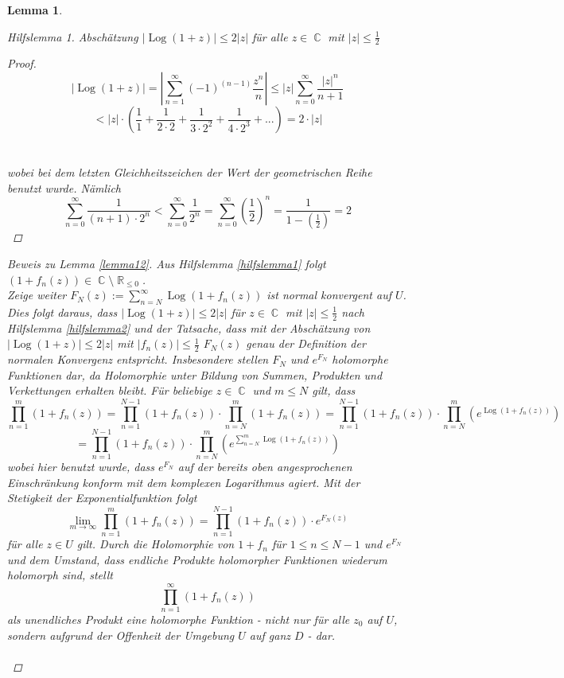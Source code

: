 \documentclass[10pt,a4paper]{article}
\theoremstyle{plain}
\newtheorem{lem}[thm]{Lemma}
\theoremstyle{definition}
\theoremstyle{remark}
\newtheorem{hilfslem}{Hilfslemma}
\DeclareMathOperator{\R}{\mathbb{R}}
\DeclareMathOperator{\C}{\mathbb{C}}
\DeclareMathOperator{\Log}{Log}
\begin{document}
\begin{lem}
\begin{hilfslem}
Abschätzung $ |\Log(1+z)|\leq 2|z|$ für alle $z \in \C $ mit $ |z| \leq \frac{1}{2}$

\begin{proof}

$$|\Log(1+z)|= |\sum_{n = 1}^\infty (-1)^{(n-1)}\frac{z^{n}}{n}|\leq|z|\sum_{n = 0}^\infty\frac{|z|^{n}}{n + 1}$$
$$< |z|\cdot (\frac{1}{1}+\frac{1}{2\cdot 2}+\frac{1}{3 \cdot2^2}+\frac{1}{4 \cdot2^3}+...) = 2\cdot|z| $$
\\
\\
wobei bei dem letzten Gleichheitszeichen der Wert der geometrischen Reihe benutzt wurde. Nämlich $$\sum_{n=0}^{\infty}\frac{1}{(n+1)\cdot2^{n}} < \sum_{n=0}^{\infty}\frac{1}{2^{n}} = \sum_{n=0}^{\infty}(\frac{1}{2})^n = \frac{1}{1-(\frac{1}{2})} = 2 $$

\end{proof}
\end{hilfslem}

\begin{proof}[Beweis zu Lemma \ref{lemma12}]
\noindent Aus Hilfslemma \ref{hilfslemma1} folgt $(1 + f_{n}(z)) \in \C \setminus \R_{\leq 0 }$. \\
 Zeige weiter $F_{N}(z) := \sum_{n = N}^\infty \Log( 1 + f_{n}(z))$ ist normal konvergent auf $U$. Dies folgt daraus, dass $| \Log( 1 + z) | \leq 2|z| $ für $z \in \C$ mit $|z| \leq \frac{1}{2}$ nach Hilfslemma \ref{hilfslemma2}  und der Tatsache, dass mit der Abschätzung von $|\Log(1+z)| \leq 2|z|$ mit $|f_n(z)|\leq \frac{1}{2}$ $F_{N}(z)$ genau der Definition der normalen Konvergenz entspricht.
Insbesondere stellen $F_{N}$ und $e^{F_{N}}$ holomorphe Funktionen dar, da Holomorphie unter Bildung von Summen, Produkten und Verkettungen erhalten bleibt. Für beliebige $z \in \C $ und $m\leq N$ gilt, dass 
$$\prod_{n = 1 }^{m}( 1 + f_{n}(z)) = \prod_{n = 1}^{N - 1}( 1 + f_{n}(z)) \cdot \prod_{n = N}^{m}( 1 + f_{n}(z))= \prod_{n = 1}^{N - 1}( 1 + f_{n}(z)) \cdot \prod_{n = N}^{m}(e^{\Log( 1 + f_{n}(z))}) $$ $$= \prod_{n = 1}^{N - 1}( 1 + f_{n}(z)) \cdot \prod_{n = N}^{m}(e^{\sum_{n = N}^{m}\Log( 1 + f_{n}(z))})$$
wobei hier benutzt wurde, dass $e^{F_{N}}$ auf der bereits oben angesprochenen Einschränkung konform mit dem komplexen Logarithmus agiert. Mit der Stetigkeit der Exponentialfunktion folgt $$\lim_{m\rightarrow\infty}\prod_{n=1}^m ( 1 + f_{n}(z)) =\prod_{n = 1}^{N - 1}(1 + f_{n}(z))\cdot e^{F_{N}(z)}$$ für alle $z \in U$ gilt. Durch die Holomorphie von $1+ f_{n}$ für $1 \leq n \leq N - 1$ und $e^{F_{N}}$ und dem Umstand, dass endliche Produkte holomorpher Funktionen wiederum holomorph sind, stellt $$\prod_{n =1}^{\infty}(1 +f_n (z))$$ als unendliches Produkt eine holomorphe Funktion - nicht nur für alle $z_0$ auf $U$, sondern aufgrund der Offenheit der Umgebung $U$ auf ganz $D$ - dar.
\\
\\
\end{proof}
\end{lem}
\end{document}
